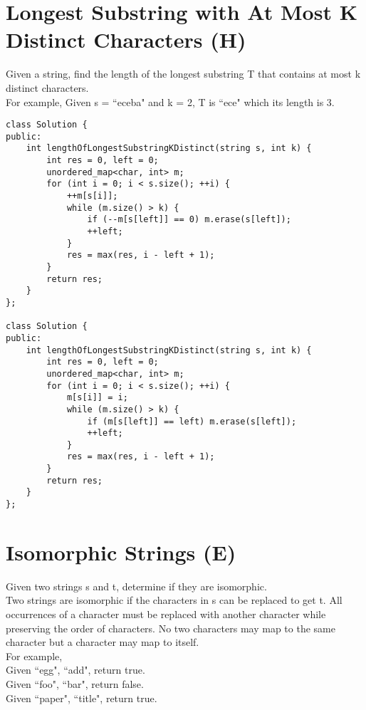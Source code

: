 \section{Longest Substring with At Most K Distinct Characters (H)}
Given a string, find the length of the longest substring T that contains at most k distinct characters.\\

For example, Given s = ``eceba" and k = 2, T is ``ece" which its length is 3.\\

\begin{lstlisting}
class Solution {
public:
    int lengthOfLongestSubstringKDistinct(string s, int k) {
        int res = 0, left = 0;
        unordered_map<char, int> m;
        for (int i = 0; i < s.size(); ++i) {
            ++m[s[i]];
            while (m.size() > k) {
                if (--m[s[left]] == 0) m.erase(s[left]);
                ++left;
            }
            res = max(res, i - left + 1);
        }
        return res;
    }
};

class Solution {
public:
    int lengthOfLongestSubstringKDistinct(string s, int k) {
        int res = 0, left = 0;
        unordered_map<char, int> m;
        for (int i = 0; i < s.size(); ++i) {
            m[s[i]] = i;
            while (m.size() > k) {
                if (m[s[left]] == left) m.erase(s[left]);
                ++left;
            }
            res = max(res, i - left + 1);
        }
        return res;
    }
};
\end{lstlisting}


\section{Isomorphic Strings (E)}
Given two strings s and t, determine if they are isomorphic. \\

Two strings are isomorphic if the characters in s can be replaced to get t. All occurrences of a character must be replaced with another character while preserving the order of characters. No two characters may map to the same character but a character may map to itself.\\

For example,\\
Given ``egg", ``add", return true.\\
Given ``foo", ``bar", return false.\\
Given ``paper", ``title", return true.\\

